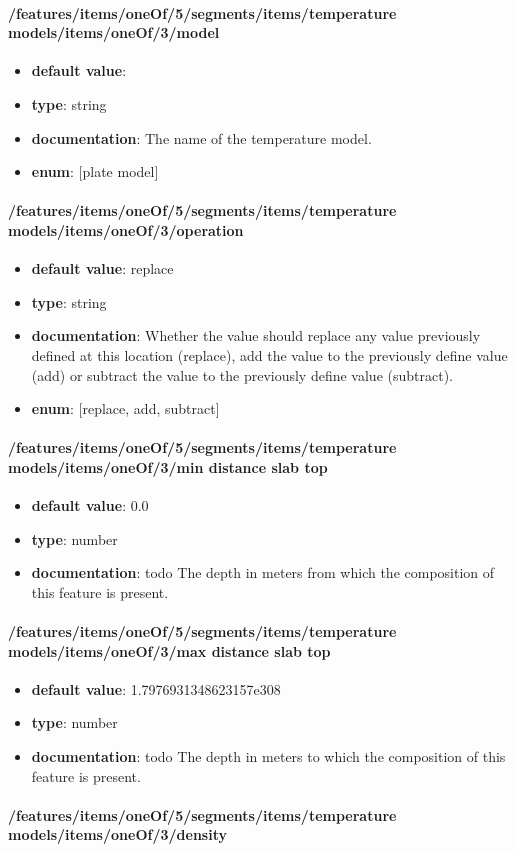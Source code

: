 \paragraph{/features/items/oneOf/5/segments/items/temperature models/items/oneOf/3/model}
\begin{itemize}\item {\bf default value}: 
\item {\bf type}: string
\item {\bf documentation}: The name of the temperature model.
\item {\bf enum}: [plate model]\end{itemize}\paragraph{/features/items/oneOf/5/segments/items/temperature models/items/oneOf/3/operation}
\begin{itemize}\item {\bf default value}: replace
\item {\bf type}: string
\item {\bf documentation}: Whether the value should replace any value previously defined at this location (replace), add the value to the previously define value (add) or subtract the value to the previously define value (subtract).
\item {\bf enum}: [replace, add, subtract]\end{itemize}\paragraph{/features/items/oneOf/5/segments/items/temperature models/items/oneOf/3/min distance slab top}
\begin{itemize}\item {\bf default value}: 0.0
\item {\bf type}: number
\item {\bf documentation}: todo The depth in meters from which the composition of this feature is present.
\end{itemize}\paragraph{/features/items/oneOf/5/segments/items/temperature models/items/oneOf/3/max distance slab top}
\begin{itemize}\item {\bf default value}: 1.7976931348623157e308
\item {\bf type}: number
\item {\bf documentation}: todo The depth in meters to which the composition of this feature is present.
\end{itemize}\paragraph{/features/items/oneOf/5/segments/items/temperature models/items/oneOf/3/density}
